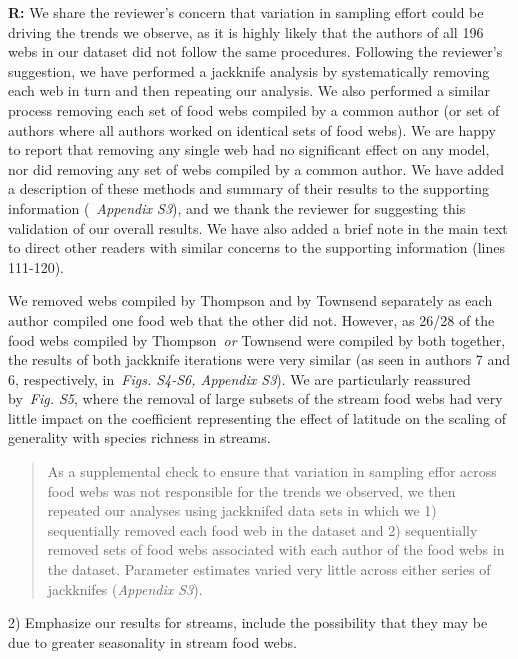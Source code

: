 \documentclass[12pt]{letter}
\begin{document}
  \textbf{R:} We share the reviewer's concern that variation in sampling
  effort could be driving the trends we observe, as it is highly likely that
  the authors of all 196 webs in our dataset did not follow the same procedures.
  Following the reviewer's suggestion, we have performed a jackknife analysis by
  systematically removing each web in turn and then repeating our analysis. We
  also performed a similar process removing each set of 
  food webs compiled by a common author (or set of authors
  where all authors worked on identical sets of food webs).
  We are happy to report that removing
  any single web had no significant effect on any model, 
  nor did removing any set of webs compiled by a common 
  author. 
  We have added a description of these methods and summary
  of their results to the supporting information 
  (~\emph{Appendix S3}), and we thank the reviewer for 
  suggesting this validation of our overall results. We 
  have also added a brief note in the main text to direct 
  other readers with similar concerns to the supporting 
  information (lines 111-120). 


  We removed webs compiled by Thompson and by 
  Townsend separately as each author compiled one food
  web that the other did not. However, as 26/28 of the
  food webs compiled by Thompson~\emph{or} Townsend were
  compiled by both together, the results of both jackknife
  iterations were very similar (as seen in authors 7 and 6, 
  respectively, in~\emph{Figs. S4-S6, Appendix S3}). 
  We are particularly reassured by~\emph{Fig. S5}, where
  the removal of large subsets of the stream food webs
  had very little impact on the coefficient representing
  the effect of latitude on the scaling of generality with
  species richness in streams.


  \begin{quotation}

    As a supplemental check to ensure that variation in sampling effor across
    food webs was not responsible for the trends we observed, we then repeated
    our analyses using jackknifed data sets in which we 1) sequentially removed
    each food web in the dataset and 2) sequentially removed sets of food webs 
    associated with each author of the food webs in the dataset. Parameter 
    estimates varied very little across either series of jackknifes (\emph{Appendix S3}).

  \end{quotation}


   2) Emphasize our results for streams, include the possibility that they
   may be due to greater seasonality in stream food webs. 
\end{document}
